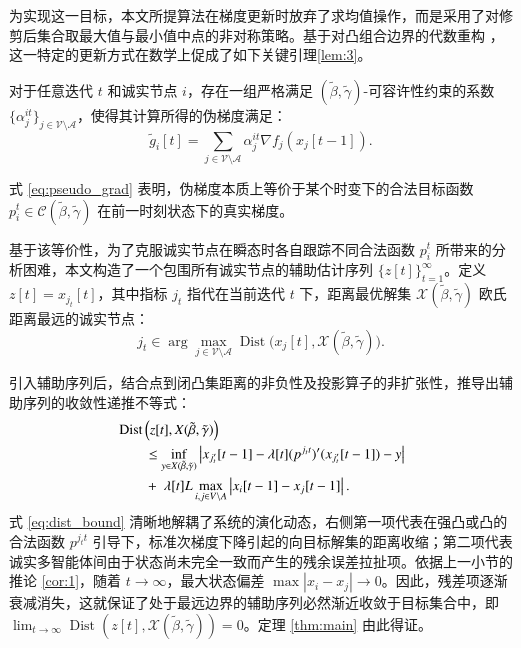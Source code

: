 为实现这一目标，本文所提算法在梯度更新时放弃了求均值操作，而是采用了对修剪后集合取最大值与最小值中点的非对称策略。基于对凸组合边界的代数重构 ，这一特定的更新方式在数学上促成了如下关键引理\ref{lem:3}。

\begin{lemma}\label{lem:3}
    对于任意迭代 $t$ 和诚实节点 $i$，存在一组严格满足 $(\tilde{\beta}, \tilde{\gamma})$-可容许性约束的系数 $\{\alpha_j^{it}\}_{j \in \mathcal{V} \setminus \mathcal{A}}$，使得其计算所得的伪梯度满足：
    \begin{equation} \label{eq:pseudo_grad}
        \tilde{g}_i[t] = \sum_{j \in \mathcal{V} \setminus \mathcal{A}} \alpha_j^{it} \nabla f_j(x_j[t-1]).
    \end{equation}
\end{lemma}

式 \eqref{eq:pseudo_grad} 表明，伪梯度本质上等价于某个时变下的合法目标函数 $p_i^t \in \mathcal{C}(\tilde{\beta}, \tilde{\gamma})$ 在前一时刻状态下的真实梯度。

基于该等价性，为了克服诚实节点在瞬态时各自跟踪不同合法函数 $p_i^t$ 所带来的分析困难，本文构造了一个包围所有诚实节点的辅助估计序列 $\{z[t]\}_{t=1}^\infty$。定义 $z[t] = x_{j_t}[t]$，其中指标 $j_t$ 指代在当前迭代 $t$ 下，距离最优解集 $\mathcal{X}(\tilde{\beta}, \tilde{\gamma})$ 欧氏距离最远的诚实节点：
\begin{equation}
    j_t \in \arg \max_{j \in \mathcal{V} \setminus \mathcal{A}} \operatorname{Dist}\Big(x_j[t], \mathcal{X}(\tilde{\beta}, \tilde{\gamma})\Big).
\end{equation}

引入辅助序列后，结合点到闭凸集距离的非负性及投影算子的非扩张性，推导出辅助序列的收敛性递推不等式：
\begin{align}
    & \operatorname{Dist} \left( z[t], X(\tilde{\beta}, \tilde{\gamma}) \right)  \notag \\
    & \qquad \leq \inf_{y \in X(\tilde{\beta}, \tilde{\gamma})} \left| x_{j'_t} [t - 1] - \lambda[t] (p^{j_t t})' (x_{j'_t} [t - 1]) - y \right|\notag \\
    & \qquad + \; \lambda[t] L \max_{i,j \in V \setminus A} \left| x_i [t - 1] - x_j [t - 1] \right|. \label{eq:dist_bound}
\end{align}
式 \eqref{eq:dist_bound} 清晰地解耦了系统的演化动态，右侧第一项代表在强凸或凸的合法函数 $p^{j_t t}$ 引导下，标准次梯度下降引起的向目标解集的距离收缩；第二项代表诚实多智能体间由于状态尚未完全一致而产生的残余误差拉扯项。依据上一小节的推论 \ref{cor:1}，随着 $t \to \infty$，最大状态偏差 $\max |x_i - x_j| \to 0$。因此，残差项逐渐衰减消失，这就保证了处于最远边界的辅助序列必然渐近收敛于目标集合中，即 $\lim_{t \to \infty} \operatorname{Dist}(z[t], \mathcal{X}(\tilde{\beta}, \tilde{\gamma})) = 0$。定理 \ref{thm:main} 由此得证。
